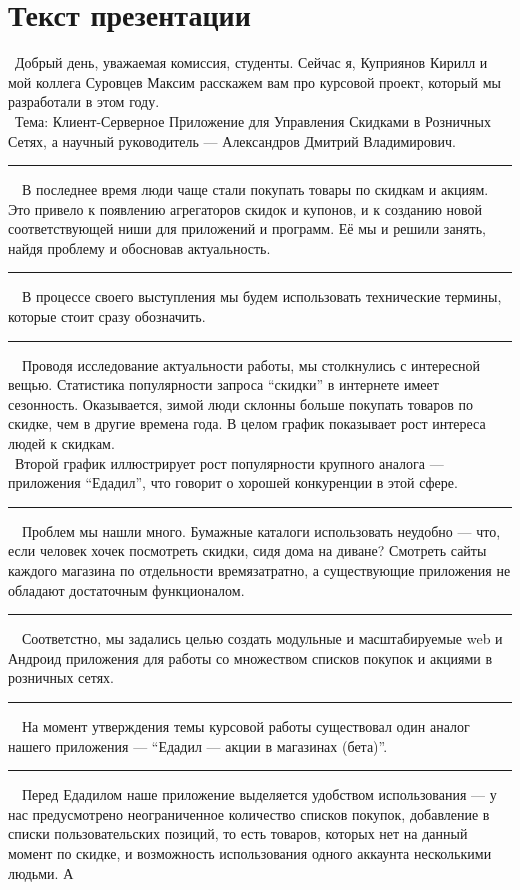 \documentclass[12pt]{article}
\renewcommand{\line}{\noindent\rule{\textwidth}{1pt}}
\begin{document}
\section*{Текст презентации}

\kir\ Добрый день, уважаемая комиссия, студенты. Сейчас я, Куприянов Кирилл и мой
коллега Суровцев Максим расскажем вам про курсовой проект, который мы
разработали в этом году.\\
\max\ Тема: Клиент-Серверное Приложение для Управления Скидками в Розничных
Сетях, а научный руководитель --- Александров Дмитрий Владимирович.\\
\line\
\kir\ В последнее время люди чаще стали покупать товары по скидкам и акциям. Это
привело к появлению агрегаторов скидок и купонов, и к созданию новой
соответствующей ниши для приложений и программ. Её мы и решили занять, найдя
проблему и обосновав актуальность.\\
\line\
\kir\ В процессе своего выступления мы будем использовать технические термины,
которые стоит сразу обозначить.\\
\line\
\max\ Проводя исследование актуальности работы, мы столкнулись с интересной вещью.
Статистика популярности запроса ``скидки'' в интернете имеет сезонность.
Оказывается, зимой люди склонны больше покупать товаров по скидке, чем в другие
времена года. В целом график показывает рост интереса людей к скидкам.\\
\kir\ Второй график иллюстрирует рост популярности крупного аналога ---
приложения ``Едадил'', что говорит о хорошей конкуренции в этой сфере.\\
\line\
\kir\ Проблем мы нашли много. Бумажные каталоги использовать неудобно --- что,
если человек хочек посмотреть скидки, сидя дома на диване? Смотреть сайты
каждого магазина по отдельности времязатратно, а существующие приложения не
обладают достаточным функционалом.\\
\line\
\kir\ Соответстно, мы задались целью создать модульные и масштабируемые web и
Андроид приложения для работы со множеством списков покупок и акциями в
розничных сетях.
\line\
\max\ На момент утверждения темы курсовой работы существовал один аналог нашего
приложения --- ``Едадил --- акции в магазинах (бета)''.\\
\line\
\kir\ Перед Едадилом наше приложение выделяется удобством использования --- у
нас предусмотрено неограниченное количество списков покупок, добавление в
списки пользовательских позиций, то есть товаров, которых нет на данный момент
по скидке, и возможность использования одного аккаунта несколькими людьми.  А
\end{document}
